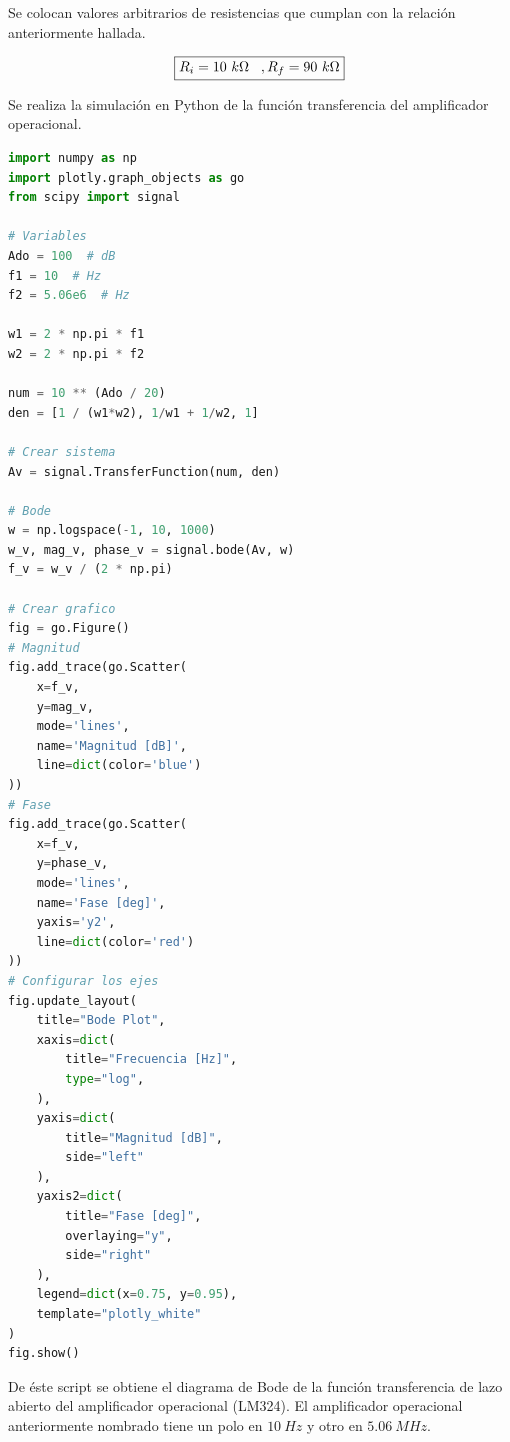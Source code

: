 \bigskip
\hspace{1mm} Se colocan valores arbitrarios de resistencias que cumplan con la relación anteriormente hallada.

\begin{equation}
    \boxed{
        R_i=10~k\Omega \hspace{3mm} , R_f=90~k\Omega
    }
\end{equation}

\bigskip

\hspace{1mm} Se realiza la simulación en Python de la función transferencia del amplificador operacional.

\begin{lstlisting}[language=Python]
import numpy as np
import plotly.graph_objects as go
from scipy import signal

# Variables
Ado = 100  # dB
f1 = 10  # Hz
f2 = 5.06e6  # Hz

w1 = 2 * np.pi * f1
w2 = 2 * np.pi * f2

num = 10 ** (Ado / 20)
den = [1 / (w1*w2), 1/w1 + 1/w2, 1]

# Crear sistema
Av = signal.TransferFunction(num, den)

# Bode
w = np.logspace(-1, 10, 1000)
w_v, mag_v, phase_v = signal.bode(Av, w)
f_v = w_v / (2 * np.pi)

# Crear grafico
fig = go.Figure()
# Magnitud
fig.add_trace(go.Scatter(
    x=f_v,
    y=mag_v,
    mode='lines',
    name='Magnitud [dB]',
    line=dict(color='blue')
))
# Fase
fig.add_trace(go.Scatter(
    x=f_v,
    y=phase_v,
    mode='lines',
    name='Fase [deg]',
    yaxis='y2',
    line=dict(color='red')
))
# Configurar los ejes
fig.update_layout(
    title="Bode Plot",
    xaxis=dict(
        title="Frecuencia [Hz]",
        type="log",
    ),
    yaxis=dict(
        title="Magnitud [dB]",
        side="left"
    ),
    yaxis2=dict(
        title="Fase [deg]",
        overlaying="y",
        side="right"
    ),
    legend=dict(x=0.75, y=0.95),
    template="plotly_white"
)
fig.show()
\end{lstlisting}
\bigskip

\hspace{1mm}  De éste script se obtiene el diagrama de Bode de la función transferencia de lazo abierto del amplificador operacional (LM324). El amplificador operacional anteriormente nombrado tiene un polo en \(10~Hz\) y otro en \(5.06~MHz\).

